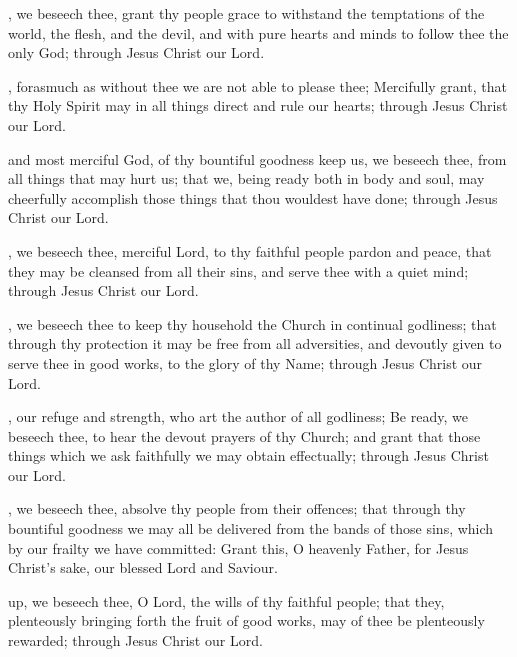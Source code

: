 , we beseech thee, grant thy people grace to withstand the temptations of the world, the flesh, and the devil, and with pure hearts and minds to follow thee the only God; through Jesus Christ our Lord.

, forasmuch as without thee we are not able to please thee; Mercifully grant, that thy Holy Spirit may in all things direct and rule our hearts; through Jesus Christ our Lord.

 and most merciful God, of thy bountiful goodness keep us, we beseech thee, from all things that may hurt us; that we, being ready both in body and soul, may cheerfully accomplish those things that thou wouldest have done; through Jesus Christ our Lord.

\label{collect-trinity-21}
, we beseech thee, merciful Lord, to thy faithful people pardon and peace, that they may be cleansed from all their sins, and serve thee with a quiet mind; through Jesus Christ our Lord.

, we beseech thee to keep thy household the Church in continual godliness; that through thy protection it may be free from all adversities, and devoutly given to serve thee in good works, to the glory of thy Name; through Jesus Christ our Lord.

, our refuge and strength, who art the author of all godliness; Be ready, we beseech thee, to hear the devout prayers of thy Church; and grant that those things which we ask faithfully we may obtain effectually; through Jesus Christ our Lord.

, we beseech thee, absolve thy people from their offences; that through thy bountiful goodness we may all be delivered from the bands of those sins, which by our frailty we have committed: Grant this, O heavenly Father, for Jesus Christ's sake, our blessed Lord and Saviour.

 up, we beseech thee, O Lord, the wills of thy faithful people; that they, plenteously bringing forth the fruit of good works, may of thee be plenteously rewarded; through Jesus Christ our Lord.

